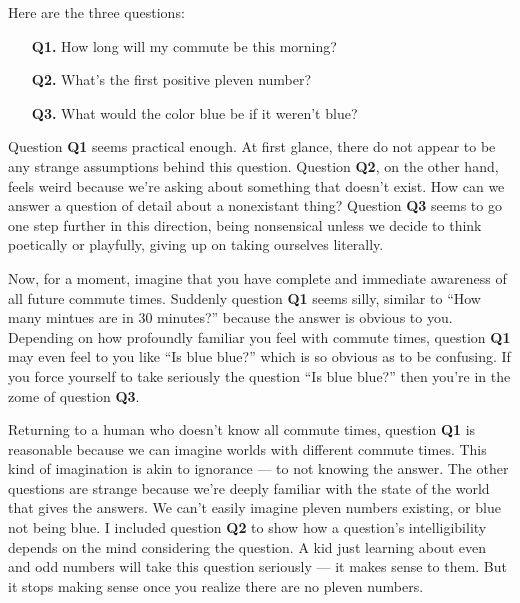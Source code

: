 \documentclass[11pt, oneside]{article}   	%
\begin{document}
Here are the three questions:
\begin{enumerate}
    \item[{\bf Q1.}] How long will my commute be this morning?
    \item[{\bf Q2.}] What's the first positive pleven number?
    \item[{\bf Q3.}] What would the color blue be if it weren't blue?
\end{enumerate}
Question {\bf Q1} seems practical enough. At first glance, there do not appear
to be any strange assumptions behind this question.
Question {\bf Q2}, on the other hand, feels weird because we're asking about
something that doesn't exist. How can we answer a question of detail about a
nonexistant thing? Question {\bf Q3} seems to go one step further in this
direction,
being nonsensical unless we decide to think poetically or
playfully, giving up on taking ourselves literally.

Now, for a moment, imagine that you have complete and immediate awareness of all
future commute times. Suddenly question {\bf Q1} seems silly, similar to
``How many mintues are in 30 minutes?''
because the answer is obvious to you.
Depending on how profoundly
familiar you feel with commute times, question {\bf Q1} may even feel to you
like ``Is blue blue?'' which is so obvious as to be confusing. If you force
yourself to take seriously the question ``Is blue blue?'' then you're in the
zome of question {\bf Q3}.

Returning to a human who doesn't know all commute times,
question {\bf Q1} is
reasonable because we can imagine worlds with different commute
times. This kind of imagination is akin to ignorance --- to not knowing the
answer.
The other questions are strange because we're deeply familiar with the state of
the world that gives the answers. We can't easily imagine pleven numbers
existing, or blue not being blue.
I included question {\bf Q2} to show how a question's intelligibility
depends on the mind
considering the question. A kid just learning about even and odd numbers will
take this question seriously --- it makes sense to them. But it stops making
sense once you realize there are no pleven numbers.
\end{document}
